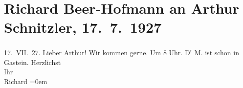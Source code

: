 

         
         \renewcommand{\erwaehntePersonen}{Personen: Richard Beer-Hofmann, Philipp Menczel}
         \renewcommand{\erwaehnteOrte}{Orte: Bad Gastein, Wien}
         \renewcommand{\erwaehnteWerke}{}
               \section[Richard Beer-Hofmann an Arthur Schnitzler, 17. 7. 1927]{ Richard Beer-Hofmann an Arthur Schnitzler, 17. 7. 1927}\nopagebreak{}\rehead{ }\begin{ledgroupsized}[t]{13cm}\normalsize\beginnumbering{} \toendnotes[C]{\smallbreak\pagebreak[2]} 
\pstart
           \raggedleft{}{\pb}17. VII. 27.\pend
           \pstart
           Lieber Arthur! Wir kommen gerne. Um 8 Uhr. D\textsuperscript{r}{ }M. ist schon in Gastein.\pend
           \pstart
           Herzlichst{\\[\baselineskip]}Ihr{\\[\baselineskip]}\spacefill\mbox{Richard}\pend
           \leftskip=0em{}
         
         \endnumbering{}\end{ledgroupsized}  \newcommand{\dateiname}{L02490}\newcommand{\titel}{Richard Beer-Hofmann an Arthur Schnitzler, 17. 7. 1927}\newcommand{\editorInnen}{Martin Anton Müller und Gerd-Hermann Susen}
      